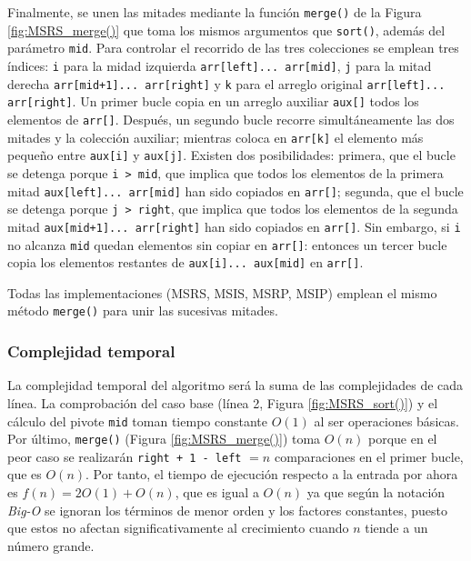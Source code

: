 \documentclass[titlepage]{article}
\begin{document}
Finalmente, se unen las mitades mediante la función \lstinline|merge()| de la Figura \ref{fig:MSRS_merge()} que toma los mismos argumentos que \lstinline|sort()|, además del parámetro \lstinline|mid|. Para controlar el recorrido de las tres colecciones se emplean tres índices: \lstinline|i| para la midad izquierda \lstinline|arr[left]... arr[mid]|, \lstinline|j| para la mitad derecha \lstinline|arr[mid+1]... arr[right]| y \lstinline|k| para el arreglo original \lstinline|arr[left]... arr[right]|. Un primer bucle copia en un arreglo auxiliar \lstinline|aux[]| todos los elementos de \lstinline|arr[]|. Después, un segundo bucle recorre simultáneamente las dos mitades y la colección auxiliar; mientras coloca en \lstinline|arr[k]| el elemento más pequeño entre \lstinline|aux[i]| y \lstinline|aux[j]|. Existen dos posibilidades: primera, que el bucle se detenga porque \lstinline|i > mid|, que implica que todos los elementos de la primera mitad \lstinline|aux[left]... arr[mid]| han sido copiados en \lstinline|arr[]|; segunda, que el bucle se detenga porque \lstinline|j > right|, que implica que todos los elementos de la segunda mitad \lstinline|aux[mid+1]... arr[right]| han sido copiados en \lstinline|arr[]|. Sin embargo, si \lstinline|i| no alcanza \lstinline|mid| quedan elementos sin copiar en \lstinline|arr[]|: entonces un tercer bucle copia los elementos restantes de \lstinline|aux[i]... aux[mid]| en \lstinline|arr[]|.

Todas las implementaciones (MSRS, MSIS, MSRP, MSIP) emplean el mismo método \lstinline|merge()| para unir las sucesivas mitades.

\subsubsection{Complejidad temporal} %
La complejidad temporal del algoritmo será la suma de las complejidades de cada línea. La comprobación del caso base (línea 2, Figura \ref{fig:MSRS_sort()}) y el cálculo del pivote \lstinline|mid| toman tiempo constante \(O(1)\) al ser operaciones básicas. Por último, \lstinline|merge()| (Figura \ref{fig:MSRS_merge()}) toma \(O(n)\) porque en el peor caso se realizarán \lstinline|right + 1 - left| \(=n\) comparaciones en el primer bucle, que es \(O(n)\). Por tanto, el tiempo de ejecución respecto a la entrada por ahora es \(f(n) = 2O(1) + O(n)\), que es igual a \(O(n)\) ya que según la notación \textit{Big-O} se ignoran los términos de menor orden y los factores constantes, puesto que estos no afectan significativamente al crecimiento cuando \(n\) tiende a un número grande.
\end{document}
